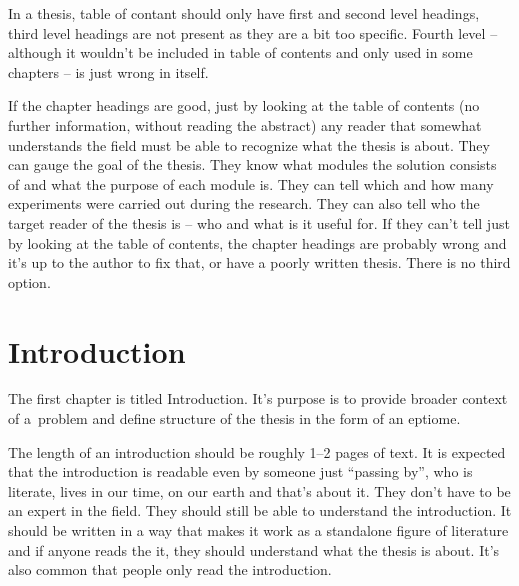 In a thesis, table of contant should only have first and second level headings, third level headings are not present as they are a bit too specific. Fourth level -- although it wouldn't be included in table of contents and only used in some chapters -- is just wrong in itself.

If the chapter headings are good, just by looking at the table of contents (no further information, without reading the abstract) any reader that somewhat understands the field must be able to recognize what the thesis is about. They can gauge the goal of the thesis. They know what modules the solution consists of and what the purpose of each module is.
They can tell which and how many experiments were carried out during the research. They can also tell who the target reader of the thesis is -- who and what is it useful for. If they can't tell just by looking at the table of contents, the chapter headings are probably wrong and it's up to the author to fix that, or have a poorly written thesis. There is no third option.


\section{Introduction}
\label{uvod}

The first chapter is titled Introduction. It's purpose is to provide broader context of a~problem and define structure of the thesis in the form of an eptiome.

The length of an introduction should be roughly 1--2 pages of text. It is expected that the introduction is readable even by someone just ``passing by'', who is literate, lives in our time, on our earth and that's about it. They don't have to be an expert in the field. They should still be able to understand the introduction. It should be written in a way that makes it work as a standalone figure of literature and if anyone reads the it, they should understand what the thesis is about. It's also common that people only read the introduction.

